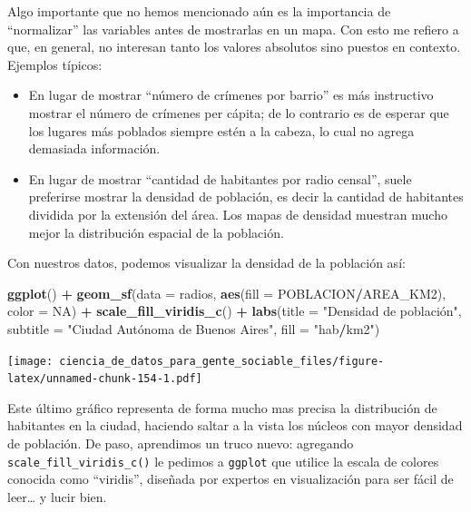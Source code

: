 \documentclass[]{book}
\newenvironment{Shaded}{\begin{snugshade}}{\end{snugshade}}
\newcommand{\KeywordTok}[1]{\textcolor[rgb]{0.13,0.29,0.53}{\textbf{#1}}}
\newcommand{\DataTypeTok}[1]{\textcolor[rgb]{0.13,0.29,0.53}{#1}}
\newcommand{\StringTok}[1]{\textcolor[rgb]{0.31,0.60,0.02}{#1}}
\newcommand{\OtherTok}[1]{\textcolor[rgb]{0.56,0.35,0.01}{#1}}
\newcommand{\OperatorTok}[1]{\textcolor[rgb]{0.81,0.36,0.00}{\textbf{#1}}}
\newcommand{\NormalTok}[1]{#1}
\providecommand{\tightlist}{%
  \setlength{\itemsep}{0pt}\setlength{\parskip}{0pt}}
\begin{document}
Algo importante que no hemos mencionado aún es la importancia de
``normalizar'' las variables antes de mostrarlas en un mapa. Con esto me
refiero a que, en general, no interesan tanto los valores absolutos sino
puestos en contexto. Ejemplos típicos:

\begin{itemize}
\tightlist
\item
  En lugar de mostrar ``número de crímenes por barrio'' es más
  instructivo mostrar el número de crímenes per cápita; de lo contrario
  es de esperar que los lugares más poblados siempre estén a la cabeza,
  lo cual no agrega demasiada información.\\
\item
  En lugar de mostrar ``cantidad de habitantes por radio censal'', suele
  preferirse mostrar la densidad de población, es decir la cantidad de
  habitantes dividida por la extensión del área. Los mapas de densidad
  muestran mucho mejor la distribución espacial de la población.
\end{itemize}

Con nuestros datos, podemos visualizar la densidad de la población así:

\begin{Shaded}
\begin{Highlighting}[]
\KeywordTok{ggplot}\NormalTok{() }\OperatorTok{+}\StringTok{ }
\StringTok{    }\KeywordTok{geom_sf}\NormalTok{(}\DataTypeTok{data =}\NormalTok{ radios, }\KeywordTok{aes}\NormalTok{(}\DataTypeTok{fill =}\NormalTok{ POBLACION}\OperatorTok{/}\NormalTok{AREA_KM2), }\DataTypeTok{color =} \OtherTok{NA}\NormalTok{) }\OperatorTok{+}
\StringTok{    }\KeywordTok{scale_fill_viridis_c}\NormalTok{() }\OperatorTok{+}
\StringTok{    }\KeywordTok{labs}\NormalTok{(}\DataTypeTok{title =} \StringTok{"Densidad de población",}
\StringTok{         subtitle = "}\NormalTok{Ciudad Autónoma de Buenos Aires}\StringTok{",}
\StringTok{         fill = "}\NormalTok{hab}\OperatorTok{/}\NormalTok{km2}\StringTok{")}
\end{Highlighting}
\end{Shaded}

\texttt{[image: ciencia\_de\_datos\_para\_gente\_sociable\_files/figure-latex/unnamed-chunk-154-1.pdf]}

Este último gráfico representa de forma mucho mas precisa la
distribución de habitantes en la ciudad, haciendo saltar a la vista los
núcleos con mayor densidad de población. De paso, aprendimos un truco
nuevo: agregando \texttt{scale\_fill\_viridis\_c()} le pedimos a
\texttt{ggplot} que utilice la escala de colores conocida como
``viridis'', diseñada por expertos en visualización para ser fácil de
leer\ldots{} y lucir bien.
\end{document}
